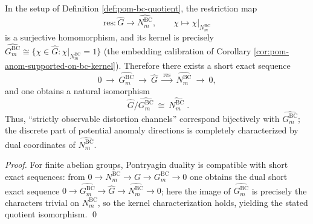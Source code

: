 \begin{corollary}\label{cor:pom-bc-pontryagin-dual-classification}
In the setup of Definition \ref{def:pom-bc-quotient}, the restriction map
\[
\mathrm{res}:\widehat G\longrightarrow \widehat{N^{\mathrm{BC}}_m},
\qquad
\chi\longmapsto \chi|_{N^{\mathrm{BC}}_m}
\]
is a surjective homomorphism, and its kernel is precisely
\(\widehat{G^{\mathrm{BC}}_m}\cong\{\chi\in\widehat G:\chi|_{N^{\mathrm{BC}}_m}=1\}\)
(the embedding calibration of Corollary \ref{cor:pom-anom-supported-on-bc-kernel}).
Therefore there exists a short exact sequence
\[
0\ \longrightarrow\ \widehat{G^{\mathrm{BC}}_m}\ \longrightarrow\ \widehat G\ \xrightarrow{\ \mathrm{res}\ }\ \widehat{N^{\mathrm{BC}}_m}\ \longrightarrow\ 0,
\]
and one obtains a natural isomorphism
\[
\boxed{\;
\widehat G/\widehat{G^{\mathrm{BC}}_m}\ \cong\ \widehat{N^{\mathrm{BC}}_m}\; }.
\]
Thus, ``strictly observable distortion channels'' correspond bijectively with \(\widehat{G^{\mathrm{BC}}_m}\); the discrete part of potential anomaly directions is completely characterized by dual coordinates of \(\widehat{N^{\mathrm{BC}}_m}\).
\end{corollary}
\begin{proof}
For finite abelian groups, Pontryagin duality is compatible with short exact sequences: from \(0\to N^{\mathrm{BC}}_m\to G\to G^{\mathrm{BC}}_m\to 0\) one obtains the dual short exact sequence
\(
0\to \widehat{G^{\mathrm{BC}}_m}\to \widehat G\to \widehat{N^{\mathrm{BC}}_m}\to 0
\);
here the image of \(\widehat{G^{\mathrm{BC}}_m}\) is precisely the characters trivial on \(N^{\mathrm{BC}}_m\), so the kernel characterization holds, yielding the stated quotient isomorphism. \qed
\end{proof}


